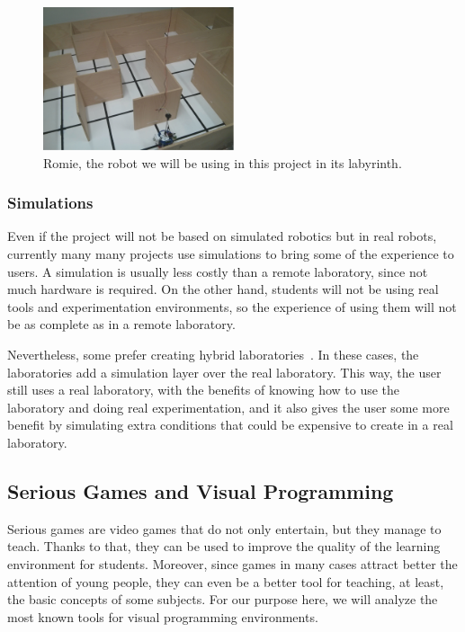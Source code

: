 \begin{figure}[!htbp]
	\centering
	\includegraphics[width=0.5\textwidth]{fig/labyrinth}
	\caption{Romie, the robot we will be using in this project in its labyrinth.}\label{fig:labyrinth}
\end{figure}

\subsubsection{Simulations}

Even if the project will not be based on simulated robotics but in real robots, currently many
many projects use simulations to bring some of the experience to users. A simulation is usually
less costly than a remote laboratory, since not much hardware is required. On the other hand,
students will not be using real tools and experimentation environments, so the experience of using
them will not be as complete as in a remote laboratory.

Nevertheless, some prefer creating hybrid laboratories~\cite{hybrid_labs}. In these cases, the
laboratories add a simulation layer over the real laboratory. This way, the user still uses a real
laboratory, with the benefits of knowing how to use the laboratory and doing real experimentation,
and it also gives the user some more benefit by simulating extra conditions that could be expensive
to create in a real laboratory.

\subsection{Serious Games and Visual Programming}

Serious games are video games that do not only entertain, but they manage to teach. Thanks to that,
they can be used to improve the quality of the learning environment for students. Moreover, since
games in many cases attract better the attention of young people, they can even be a better tool for
teaching, at least, the basic concepts of some subjects. For our purpose here, we will analyze the
most known tools for visual programming environments.

